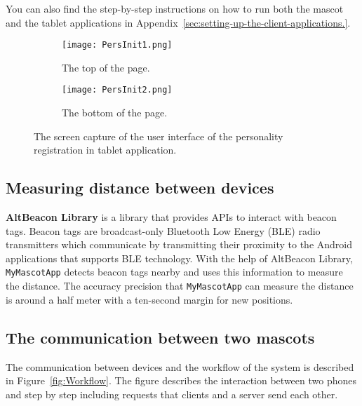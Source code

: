 You can also find the step-by-step instructions on how to run both the mascot and the tablet applications in
Appendix~\ref{sec:setting-up-the-client-applications.}.

\begin{figure}[hbt!]
    \centering
    \begin{subfigure}{.40\textwidth}
        \centering
        \texttt{[image: PersInit1.png]}
        \caption{The top of the page.}
        \label{fig:sub1}
    \end{subfigure}\hfill%
    \begin{subfigure}{.40\textwidth}
        \centering
        \texttt{[image: PersInit2.png]}
        \caption{The bottom of the page.}
        \label{fig:sub2}
    \end{subfigure}\hfill
    \caption{The screen capture of the user interface of the personality registration in tablet application.}
    \label{fig:PersInit}
\end{figure}

\subsection{Measuring distance between devices}
\label{subsec:measuring-distance-between-devices.}
\textbf{AltBeacon Library} is a library that provides APIs to interact with beacon tags.
Beacon tags are broadcast-only Bluetooth Low Energy (BLE) radio transmitters which communicate by
transmitting their proximity to the Android applications that supports BLE technology.
With the help of AltBeacon Library, \texttt{MyMascotApp} detects beacon tags nearby
and uses this information to measure the distance.
The accuracy precision that \texttt{MyMascotApp} can measure the distance is around a half meter
with a ten-second margin for new positions.

\subsection{The communication between two mascots}
\label{subsec:the-communication-between-two-mascots.}
The communication between devices and the workflow of the system is described in Figure~\ref{fig:Workflow}.
The figure describes the interaction between two phones and step by step including requests
that clients and a server send each other.

